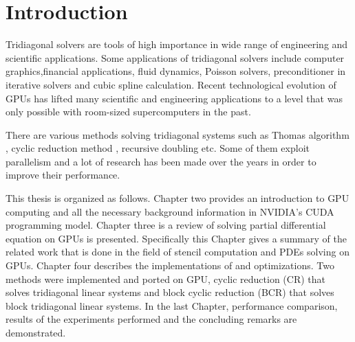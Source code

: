 \chapter{Introduction}

Tridiagonal solvers are tools of high importance in wide range of engineering and scientific applications. Some applications of tridiagonal solvers include computer graphics,financial applications, fluid dynamics, Poisson solvers, preconditioner in iterative solvers and cubic spline calculation. Recent technological evolution of GPUs has lifted many scientific and engineering applications to a level that was only possible with room-sized supercomputers in the past. 

There are various methods solving tridiagonal systems such as Thomas algorithm , cyclic reduction method , recursive doubling etc. Some of them exploit parallelism and a lot of research has been made over the years in order to improve their performance.

This thesis is organized as follows. Chapter two provides an introduction to GPU computing and all the necessary background information in NVIDIA’s CUDA programming model. Chapter three is a review of solving partial differential equation on GPUs is presented. Specifically this Chapter gives a summary of the related work that is done in the field of stencil computation and PDEs solving on GPUs. Chapter four describes the implementations of  and optimizations. Two methods were implemented and ported on GPU, cyclic reduction (CR) that solves tridiagonal linear systems and block cyclic reduction (BCR) that solves block tridiagonal linear systems. In the last Chapter, performance comparison,  results of the experiments performed and the concluding remarks are demonstrated.

